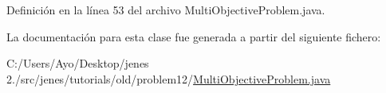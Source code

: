 Definición en la línea 53 del archivo Multi\-Objective\-Problem.\-java.



La documentación para esta clase fue generada a partir del siguiente fichero\-:\begin{DoxyCompactItemize}
\item 
C\-:/\-Users/\-Ayo/\-Desktop/jenes 2./src/jenes/tutorials/old/problem12/\hyperlink{old_2problem12_2_multi_objective_problem_8java}{Multi\-Objective\-Problem.\-java}\end{DoxyCompactItemize}
